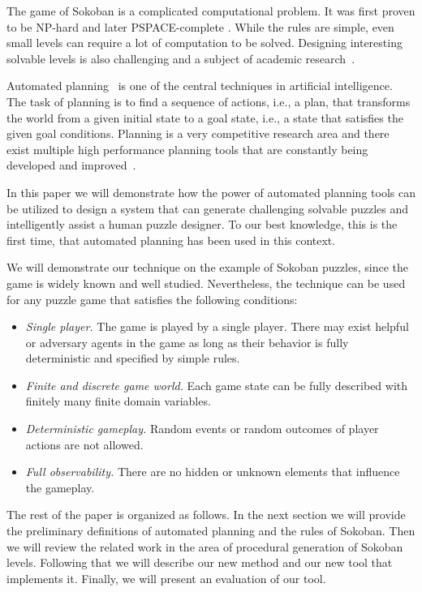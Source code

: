 \documentclass[runningheads]{llncs}
\begin{document}
The game of Sokoban is a complicated computational problem. It was first proven
to be NP-hard \cite{dorit96} and later PSPACE-complete \cite{culberson97}. While
the rules are simple, even small levels can require a lot of computation to be
solved. Designing interesting solvable levels is also challenging and a subject
of academic research~\cite{murase1996automatic,taylor2011procedural,kartal2016data,de2019procedural}.

Automated planning~\cite{ghallab2016automated} is one of the central techniques in artificial intelligence.
The task of planning is to find a sequence of actions, i.e., a plan, that transforms the world
from a given initial state to a goal state, i.e., a state that satisfies the given goal conditions.
Planning is a very competitive research area and there exist multiple high performance planning
tools that are constantly being developed and improved~\cite{ipc}.

In this paper we will demonstrate how the power of automated planning tools can be utilized
to design a system that can generate challenging solvable puzzles and intelligently assist
a human puzzle designer. To our best knowledge, this is the first time, that automated planning has
been used in this context.

We will demonstrate our technique on the example of Sokoban puzzles, since the game is widely known
and well studied. Nevertheless, the technique can be used for any puzzle game that satisfies
the following conditions:
\begin{itemize}
\item \emph{Single player.} The game is played by a single player. There may exist helpful or adversary agents
in the game as long as their behavior is fully deterministic and specified by simple rules.
\item \emph{Finite and discrete game world.} Each game state can be fully described with finitely many
 finite domain variables.
\item \emph{Deterministic gameplay.} Random events or random outcomes of player actions are not allowed.
\item \emph{Full observability.} There are no hidden or unknown elements that influence the gameplay.
\end{itemize}

The rest of the paper is organized as follows. In the next section we will provide the preliminary definitions
of automated planning and the rules of Sokoban. Then we will review the related work in the
area of procedural generation of Sokoban levels. Following that we will describe our new
method and our new tool that implements it. Finally, we will present an evaluation of our tool.
\end{document}
